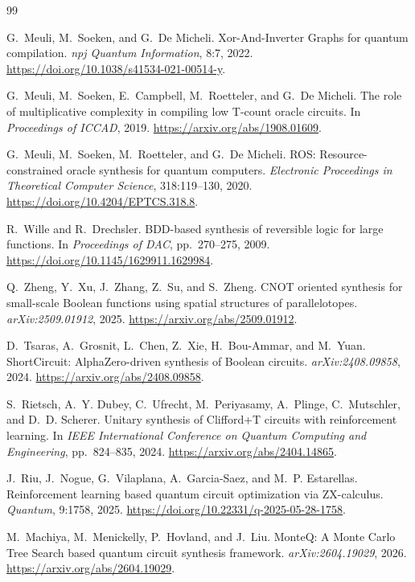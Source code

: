 \documentclass[UTF8,fontset=macnew,11pt]{ctexart}
\begin{document}
\begin{thebibliography}{99}

G.~Meuli, M.~Soeken, and G.~De Micheli.
\newblock Xor-And-Inverter Graphs for quantum compilation.
\newblock \emph{npj Quantum Information}, 8:7, 2022.
\newblock \url{https://doi.org/10.1038/s41534-021-00514-y}.

G.~Meuli, M.~Soeken, E.~Campbell, M.~Roetteler, and G.~De Micheli.
\newblock The role of multiplicative complexity in compiling low T-count oracle circuits.
\newblock In \emph{Proceedings of ICCAD}, 2019.
\newblock \url{https://arxiv.org/abs/1908.01609}.

G.~Meuli, M.~Soeken, M.~Roetteler, and G.~De Micheli.
\newblock ROS: Resource-constrained oracle synthesis for quantum computers.
\newblock \emph{Electronic Proceedings in Theoretical Computer Science}, 318:119--130, 2020.
\newblock \url{https://doi.org/10.4204/EPTCS.318.8}.

R.~Wille and R.~Drechsler.
\newblock BDD-based synthesis of reversible logic for large functions.
\newblock In \emph{Proceedings of DAC}, pp.~270--275, 2009.
\newblock \url{https://doi.org/10.1145/1629911.1629984}.

Q.~Zheng, Y.~Xu, J.~Zhang, Z.~Su, and S.~Zheng.
\newblock CNOT oriented synthesis for small-scale Boolean functions using spatial structures of parallelotopes.
\newblock \emph{arXiv:2509.01912}, 2025.
\newblock \url{https://arxiv.org/abs/2509.01912}.

D.~Tsaras, A.~Grosnit, L.~Chen, Z.~Xie, H.~Bou-Ammar, and M.~Yuan.
\newblock ShortCircuit: AlphaZero-driven synthesis of Boolean circuits.
\newblock \emph{arXiv:2408.09858}, 2024.
\newblock \url{https://arxiv.org/abs/2408.09858}.

S.~Rietsch, A.~Y. Dubey, C.~Ufrecht, M.~Periyasamy, A.~Plinge, C.~Mutschler, and D.~D. Scherer.
\newblock Unitary synthesis of Clifford+T circuits with reinforcement learning.
\newblock In \emph{IEEE International Conference on Quantum Computing and Engineering}, pp.~824--835, 2024.
\newblock \url{https://arxiv.org/abs/2404.14865}.

J.~Riu, J.~Nogue, G.~Vilaplana, A.~Garcia-Saez, and M.~P. Estarellas.
\newblock Reinforcement learning based quantum circuit optimization via ZX-calculus.
\newblock \emph{Quantum}, 9:1758, 2025.
\newblock \url{https://doi.org/10.22331/q-2025-05-28-1758}.

M.~Machiya, M.~Menickelly, P.~Hovland, and J.~Liu.
\newblock MonteQ: A Monte Carlo Tree Search based quantum circuit synthesis framework.
\newblock \emph{arXiv:2604.19029}, 2026.
\newblock \url{https://arxiv.org/abs/2604.19029}.

\end{thebibliography}
\end{document}

